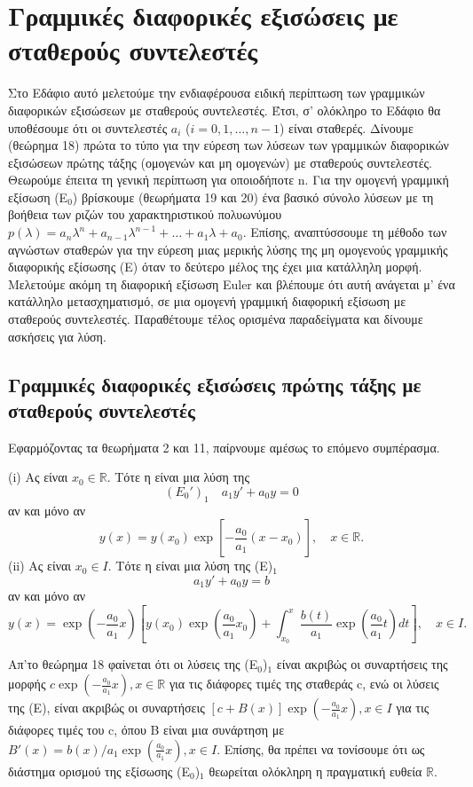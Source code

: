 \documentclass[11pt,a4paper,twoside]{book}
\newcommand{\titlefont}[1]{{\fontfamily{maksf}\selectfont #1}}
\newcounter{thewrhma}[chapter]
\renewcommand{\thethewrhma}{\thechapter.\arabic{thewrhma}}
\newcommand{\thewr}{\refstepcounter{thewrhma}{\bf\titlefont{\textcolor{secondarycolor}{\large Θεώρημα\hspace{2mm}\thethewrhma}}}\hspace{1mm}}{}
\newenvironment{Thewrhma}[1]
{\begin{tcolorbox}[title=\thewr\ \ :\ \  {\textcolor{black}{\bf{\large\titlefont{#1}}}},
breakable,
enhanced standard,
titlerule=-.2pt,
toprule=0pt, 
rightrule=0pt, 
bottomrule=0pt,
colback=white,
left=2mm,
top=1mm,
bottom=0mm,
boxrule=0pt,
colframe=white,
borderline west={1.5mm}{0pt}{secondarycolor},
leftrule=2mm,
sharp corners,
coltitle=secondarycolor]}
{\end{tcolorbox}}
\begin{document}
\section{Γραμμικές διαφορικές εξισώσεις με σταθερούς συντελεστές}

Στο Εδάφιο αυτό μελετούμε την ενδιαφέρουσα ειδική περίπτωση των γραμμικών διαφορικών εξισώσεων με σταθερούς συντελεστές. Έτσι, σ' ολόκληρο το Εδάφιο θα υποθέσουμε ότι οι συντελεστές $a_i$ ($i=0,1,\dots,n-1$) είναι σταθερές. Δίνουμε (θεώρημα 18) πρώτα το τύπο για την εύρεση των λύσεων των γραμμικών διαφορικών εξισώσεων πρώτης τάξης (ομογενών και μη ομογενών) με σταθερούς συντελεστές. Θεωρούμε έπειτα τη γενική περίπτωση για οποιοδήποτε n. Για την ομογενή γραμμική εξίσωση (Ε$_0$) βρίσκουμε (θεωρήματα 19 και 20) ένα βασικό σύνολο λύσεων με τη βοήθεια των ριζών του χαρακτηριστικού πολυωνύμου $p(\lambda)=a_n\lambda^n + a_{n-1}\lambda^{n-1} + \dots + a_1\lambda + a_0$. Επίσης, αναπτύσσουμε τη μέθοδο των αγνώστων σταθερών για την εύρεση μιας μερικής λύσης της μη ομογενούς γραμμικής διαφορικής εξίσωσης (Ε) όταν το δεύτερο μέλος της έχει μια κατάλληλη μορφή. Μελετούμε ακόμη τη διαφορική εξίσωση Euler και βλέπουμε ότι αυτή ανάγεται μ' ένα κατάλληλο μετασχηματισμό, σε μια ομογενή γραμμική διαφορική εξίσωση με σταθερούς συντελεστές. Παραθέτουμε τέλος ορισμένα παραδείγματα και δίνουμε ασκήσεις για λύση.

\subsection{Γραμμικές διαφορικές εξισώσεις πρώτης τάξης με σταθερούς συντελεστές}

Εφαρμόζοντας τα θεωρήματα 2 και 11, παίρνουμε αμέσως το επόμενο συμπέρασμα.

\begin{Thewrhma}{18.}
(i) Ας είναι $x_0\in\mathbb{R}$. Τότε η είναι μια λύση της
\[
    (E_0')_1 \quad a_1y' + a_0y = 0
\]
αν και μόνο αν
\[
    y(x) = y(x_0) \exp[-\frac{a_0}{a_1}(x-x_0)], \quad x\in\mathbb{R}.
\]
(ii) Ας είναι $x_0\in I$. Τότε η είναι μια λύση της (E)$_1$
\[
    a_1y' + a_0y = b
\]
αν και μόνο αν
\[
    y(x) = \exp\left(-\frac{a_0}{a_1}x\right)\left[y(x_0)\exp\left(\frac{a_0}{a_1}x_0\right) + \int_{x_0}^x \frac{b(t)}{a_1} \exp\left(\frac{a_0}{a_1}t\right) dt\right], \quad x\in I.
\]
\end{Thewrhma}
Απ'το θεώρημα 18 φαίνεται ότι οι λύσεις της (Ε$_0$)$_1$ είναι ακριβώς οι συναρτήσεις της μορφής $c \exp(-\frac{a_0}{a_1}x), x\in\mathbb{R}$ για τις διάφορες τιμές της σταθεράς c, ενώ οι λύσεις της (Ε), είναι ακριβώς οι συναρτήσεις $[c+B(x)]\exp(-\frac{a_0}{a_1}x), x\in I$ για τις διάφορες τιμές του c, όπου Β είναι μια συνάρτηση με $B'(x) = b(x)/a_1 \exp(\frac{a_0}{a_1}x), x\in I$. Επίσης, θα πρέπει να τονίσουμε ότι ως διάστημα ορισμού της εξίσωσης (Ε$_0$)$_1$ θεωρείται ολόκληρη η πραγματική ευθεία $\mathbb{R}$.
\end{document}
